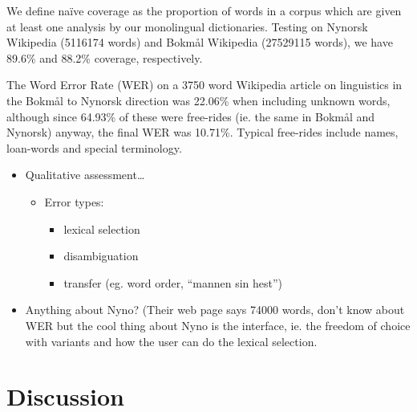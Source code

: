 \documentclass[11pt]{article}
\begin{document}
  \label{SEC:eval}
We define naïve coverage as the proportion of words in a corpus which
are given at least one analysis by our monolingual
dictionaries. Testing on Nynorsk Wikipedia (5116174 words) and Bokmål
Wikipedia (27529115 words), we have 89.6\% and 88.2\% coverage,
respectively.

The Word Error Rate (WER) on a 3750 word Wikipedia article on
linguistics in the Bokmål to Nynorsk direction was 22.06\% when
including unknown words, although since 64.93\% of these were
free-rides (ie. the same in Bokmål and Nynorsk) anyway, the final WER
was 10.71\%. Typical free-rides include names, loan-words and special
terminology.

\begin{itemize}
\item Qualitative assessment\ldots{}

\begin{itemize}
\item Error types:

\begin{itemize}
\item lexical selection
\item disambiguation
\item transfer (eg. word order, ``mannen sin hest'')
\end{itemize}

\end{itemize}

\item Anything about Nyno? (Their web page says 74000 words, don't know
  about WER but the cool thing about Nyno is the interface, ie. the
  freedom of choice with variants and how the user can do the lexical
  selection.
\end{itemize}
\section{Discussion}
\label{sec-5}
\end{document}
